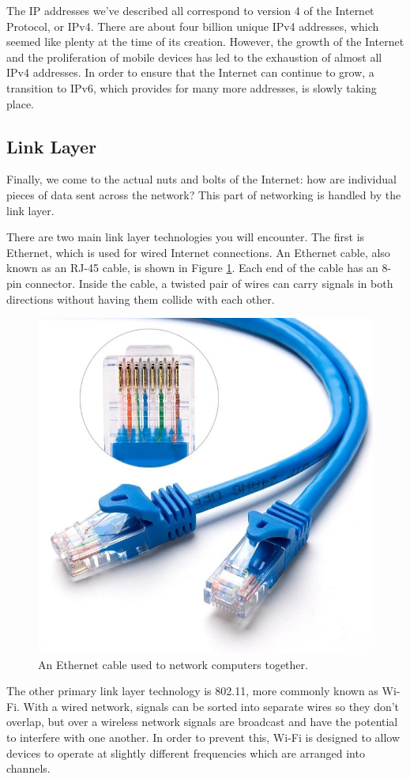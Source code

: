 The IP addresses we've described all correspond to version 4 of the Internet Protocol, or IPv4. There are about four billion unique IPv4 addresses, which seemed like plenty at the time of its creation. However, the growth of the Internet and the proliferation of mobile devices has led to the exhaustion of almost all IPv4 addresses. In order to ensure that the Internet can continue to grow, a transition to IPv6, which provides for many more addresses, is slowly taking place.

\subsection{Link Layer}

Finally, we come to the actual nuts and bolts of the Internet: how are individual pieces of data sent across the network? This part of networking is handled by the link layer.

There are two main link layer technologies you will encounter. The first is Ethernet, which is used for wired Internet connections. An Ethernet cable, also known as an RJ-45 cable, is shown in Figure \ref{fig:ethernet}. Each end of the cable has an 8-pin connector. Inside the cable, a twisted pair of wires can carry signals in both directions without having them collide with each other.

\begin{figure}
    \centering
    \includegraphics[width=.6\linewidth]{images/ethernet.jpg}
    \caption{An Ethernet cable used to network computers together.}
    \label{fig:ethernet}
\end{figure}

The other primary link layer technology is 802.11, more commonly known as Wi-Fi. With a wired network, signals can be sorted into separate wires so they don't overlap, but over a wireless network signals are broadcast and have the potential to interfere with one another. In order to prevent this, Wi-Fi is designed to allow devices to operate at slightly different frequencies which are arranged into channels.

